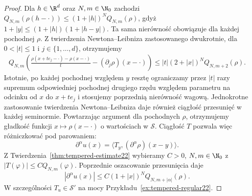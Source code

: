 \begin{proof}
Dla $h\in\R^d$ oraz $N,m\in\N_0$ zachodzi
$Q_{N,m}(\rho(h-\cdot))\le(1+|h|)^N Q_{N,m}(\rho)$,
gdyż $1+|y|\le(1+|h|)(1+|h-y|)$.
Ta sama nierówność obowiązuje dla każdej pochodnej
$\rho$. Z twierdzenia Newtona--Leibniza zastosowanego
dwukrotnie, dla $0<|t|\le1$ i $j\in\{1,\ldots,d\}$,
otrzymujemy
\[
\begin{aligned}
 Q_{N,m}\left(
 \frac{\rho(x+te_j-\cdot)-\rho(x-\cdot)}{t}
 -(\partial_j\rho)(x-\cdot)\right)
 \le |t|(2+|x|)^N Q_{N,m+2}(\rho).
\end{aligned}
\]
Istotnie, po każdej pochodnej względem $y$ resztę
ograniczamy przez $|t|$ razy supremum odpowiedniej
pochodnej drugiego rzędu względem parametru na
odcinku od $x$ do $x+te_j$ i stosujemy poprzednią
nierówność wagową. Jednokrotne zastosowanie twierdzenia
Newtona--Leibniza daje również ciągłość przesunięć
w każdej seminormie. Powtarzając argument dla
pochodnych $\rho$, otrzymujemy gładkość funkcji
$x\mapsto\rho(x-\cdot)$ o wartościach w $\mathcal S$.
Ciągłość $T$ pozwala więc różniczkować pod parowaniem:
\[
 \partial^\alpha u(x)=\langle T_y,
 (\partial^\alpha\rho)(x-y)\rangle.
\]
Z Twierdzenia~\ref{thm:tempered-estimate22} wybieramy
$C>0$, $N,m\in\N_0$ z $|T(\varphi)|\le C Q_{N,m}(\varphi)$.
Poprzednie oszacowanie przesunięcia daje
\[
 |\partial^\alpha u(x)|\le
 C(1+|x|)^N Q_{N,m+|\alpha|}(\rho).
\]
W szczególności $T_u\in\mathcal S'$ na mocy
Przykładu~\ref{ex:tempered-regular22}.


\end{proof}
